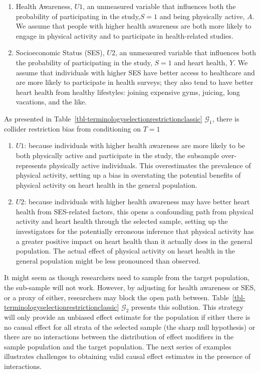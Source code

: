 \documentclass[
  single column]{article}
\begin{document}
\begin{enumerate}
\def\labelenumi{\arabic{enumi}.}
\item
  Health Awareness, \(U1\), an unmeasured variable that influences both
  the probability of participating in the study,\(\boxed{S = 1}\) and
  being physically active, \(A\). We assume that people with higher
  health awareness are both more likely to engage in physical activity
  and to participate in health-related studies.
\item
  Socioeconomic Status (SES), \(U2\), an unmeasured variable that
  influences both the probability of participating in the study,
  \(\boxed{S = 1}\) and heart health, \(Y\). We assume that individuals
  with higher SES have better access to healthcare and are more likely
  to participate in health surveys; they also tend to have better heart
  health from healthy lifestyles: joining expensive gyms, juicing, long
  vacations, and the like.
\end{enumerate}

As presented in Table~\ref{tbl-terminologyselectionrestrictionclassic}
\(\mathcal{G}_1\), there is collider restriction bias from conditioning
on \(T=1\)

\begin{enumerate}
\def\labelenumi{\arabic{enumi}.}
\item
  \textbf{\(U1\)}: because individuals with higher health awareness are
  more likely to be both physically active and participate in the study,
  the subsample over-represents physically active individuals. This
  overestimates the prevalence of physical activity, setting up a bias
  in overstating the potential benefits of physical activity on heart
  health in the general population.
\item
  \textbf{\(U2\)}: because individuals with higher health awareness may
  have better heart health from SES-related factors, this opens a
  confounding path from physical activity and heart health through the
  selected sample, setting up the investigators for the potentially
  erroneous inference that physical activity has a greater positive
  impact on heart health than it actually does in the general
  population. The actual effect of physical activity on heart health in
  the general population might be less pronounced than observed.
\end{enumerate}

It might seem as though researchers need to sample from the target
population, the sub-sample will not work. However, by adjusting for
health awareness or SES, or a proxy of either, researchers may block the
open path between.
Table~\ref{tbl-terminologyselectionrestrictionclassic} \(\mathcal{G}_2\)
presents this sollution. This strategy will only provide an unbiased
effect estimate for the population if either there is no causal effect
for all strata of the selected sample (the sharp null hypothesis) or
there are no interactions between the distribution of effect modifiers
in the sample population and the target population. The next series of
examples illustrates challenges to obtaining valid causal effect
estimates in the presence of interactions.
\end{document}
